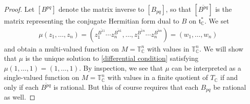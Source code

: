 \documentclass[10pt,a4paper]{amsart}
\numberwithin{equation}{section}
\begin{document}
\begin{proof}
Let $[B^{pq}]$ denote the matrix inverse to $[B_{pq}]$, so that $[\overline{B^{pq}}]$ is the matrix representing the conjugate Hermitian form dual to $B$ on ${\mathfrak t}_{\mathbb C}^*$. We set
\begin{gather*}%
\mu(z_1,\dots,z_n)=\left(z_1^{\overline{B^{11}}}\cdots z_n^{\overline{B^{n1}}},\dots,z_1^{\overline{B^{1n}}}\cdots z_n^{\overline{B^{nn}}}\right)=(w_1,\dots,w_n)
\end{gather*}
and obtain a multi-valued function on $M={\mathbb T}_{\mathbb C}^n$ with values in ${\mathbb T}_{\mathbb C}^n$. We will show that $\mu$ is the unique solution to \eqref{differential condition} satisfying $\mu(1,\dots,1)=(1,\dots,1)$. By inspection, we see that $\mu$ can be interpreted as a single-valued function on $M={\mathbb T}_{\mathbb C}^n$ with values in a f\/inite quotient of $T_{\mathbb C}$ if and only if each $\overline{B^{pq}}$ is rational. But this of course requires that each $B_{pq}$ be rational as well.


\end{proof}
\end{document}
